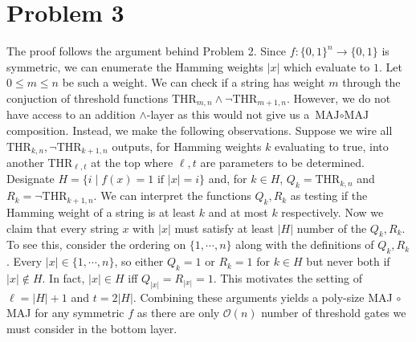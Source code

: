 \documentclass[12pt]{article}%
\begin{document}
\section{Problem 3}
The proof follows the argument behind Problem 2. Since $f:\{0,1\}^n \rightarrow \{0,1\}$ is symmetric, we can enumerate the Hamming weights $|x|$ which evaluate to $1$. Let $0 \leq m \leq n$ be such a weight. We can check if a string has weight $m$ through the conjuction of threshold functions $\text{THR}_{m,n} \wedge \neg \text{THR}_{m+1,n}$. However, we do not have access to an addition $\wedge$-layer as this would not give us a $\text{MAJ} \circ \text{MAJ}$ composition. Instead, we make the following observations. Suppose we wire all $\text{THR}_{k,n}, \neg \text{THR}_{k+1,n}$ outputs, for Hamming weights $k$ evaluating to true, into another THR$_{\ell,t}$ at the top where $\ell,t$ are parameters to be determined. Designate $H = \{i \mid f(x) = 1 \text{ if } |x| = i \}$ and, for $k \in H$, $Q_k = \text{THR}_{k,n}$ and $R_k = \neg \text{THR}_{k+1,n}$. We can interpret the functions $Q_k, R_k$ as testing if the Hamming weight of a string is at least $k$ and at most $k$ respectively. Now we claim that every string $x$ with $|x|$ must satisfy at least $|H|$ number of the $Q_k,R_k$. To see this, consider the ordering on $\{1,\cdots, n\}$ along with the definitions of $Q_k, R_k$. Every $|x| \in \{1,\cdots, n\}$, so either $Q_k = 1 $ or $R_k = 1$ for $k \in H$ but never both if $|x| \not\in H$. In fact, $|x| \in H$ iff $Q_{|x|} =  R_{|x|} = 1 $. This motivates the setting of $\ell = |H| + 1$ and $t = 2|H|$. Combining these arguments yields a poly-size MAJ $\circ$ MAJ for any symmetric $f$ as there are only $\mathcal{O}(n)$ number of threshold gates we must consider in the bottom layer.
\end{document}
